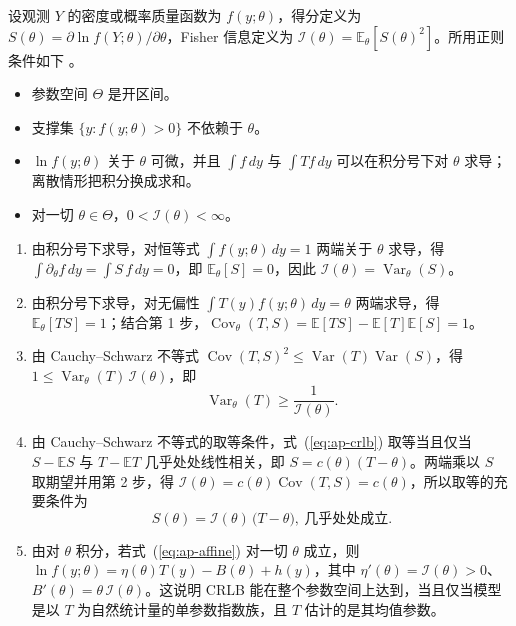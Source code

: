 设观测 $Y$ 的密度或概率质量函数为 $f(y;\theta)$，得分定义为 $S(\theta)=\partial\ln f(Y;\theta)/\partial\theta$，Fisher 信息定义为 $\mathcal I(\theta)=\mathbb{E}_\theta[S(\theta)^2]$。所用正则条件如下 \citep{lehmann1998point}。
\begin{itemize}
\item 参数空间 $\Theta$ 是开区间。
\item 支撑集 $\{y:f(y;\theta)>0\}$ 不依赖于 $\theta$。
\item $\ln f(y;\theta)$ 关于 $\theta$ 可微，并且 $\int f\,dy$ 与 $\int T f\,dy$ 可以在积分号下对 $\theta$ 求导；离散情形把积分换成求和。
\item 对一切 $\theta\in\Theta$，$0<\mathcal I(\theta)<\infty$。
\end{itemize}

\begin{enumerate}
\item 由积分号下求导，对恒等式 $\int f(y;\theta)\,dy=1$ 两端关于 $\theta$ 求导，得 $\int\partial_\theta f\,dy=\int S\,f\,dy=0$，即 $\mathbb{E}_\theta[S]=0$，因此 $\mathcal I(\theta)=\operatorname{Var}_\theta(S)$。
\item 由积分号下求导，对无偏性 $\int T(y)f(y;\theta)\,dy=\theta$ 两端求导，得 $\mathbb{E}_\theta[TS]=1$；结合第 1 步，$\operatorname{Cov}_\theta(T,S)=\mathbb{E}[TS]-\mathbb{E}[T]\mathbb{E}[S]=1$。
\item 由 Cauchy--Schwarz 不等式 $\operatorname{Cov}(T,S)^2\le\operatorname{Var}(T)\operatorname{Var}(S)$，得 $1\le\operatorname{Var}_\theta(T)\,\mathcal I(\theta)$，即
\begin{equation}\label{eq:ap-crlb}
\operatorname{Var}_\theta(T)\ge\frac{1}{\mathcal I(\theta)}.
\end{equation}
\item 由 Cauchy--Schwarz 不等式的取等条件，式~(\ref{eq:ap-crlb}) 取等当且仅当 $S-\mathbb{E}S$ 与 $T-\mathbb{E}T$ 几乎处处线性相关，即 $S=c(\theta)(T-\theta)$。两端乘以 $S$ 取期望并用第 2 步，得 $\mathcal I(\theta)=c(\theta)\operatorname{Cov}(T,S)=c(\theta)$，所以取等的充要条件为
\begin{equation}\label{eq:ap-affine}
S(\theta)=\mathcal I(\theta)\,\big(T-\theta\big),\ \text{几乎处处成立}.
\end{equation}
\item 由对 $\theta$ 积分，若式~(\ref{eq:ap-affine}) 对一切 $\theta$ 成立，则 $\ln f(y;\theta)=\eta(\theta)T(y)-B(\theta)+h(y)$，其中 $\eta'(\theta)=\mathcal I(\theta)>0$、$B'(\theta)=\theta\,\mathcal I(\theta)$。这说明 CRLB 能在整个参数空间上达到，当且仅当模型是以 $T$ 为自然统计量的单参数指数族，且 $T$ 估计的是其均值参数。

\end{enumerate}

